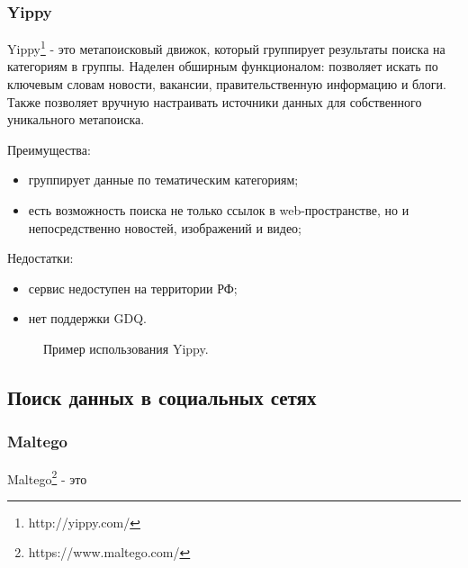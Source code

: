 \subsubsection{Yippy}
Yippy\footnote{http://yippy.com/} - это метапоисковый движок, который группирует результаты поиска на категориям в группы.
Наделен обширным функционалом: позволяет искать по ключевым словам новости, вакансии, правительственную информацию и блоги.
Также позволяет вручную настраивать источники данных для собственного уникального метапоиска. \cite{yippywikipedia}

Преимущества:
\begin{itemize}
    \item группирует данные по тематическим категориям;
    \item есть возможность поиска не только ссылок в web-пространстве, но и непосредственно новостей, изображений и видео;
\end{itemize}

Недостатки:
\begin{itemize}
    \item сервис недоступен на территории РФ;
    \item нет поддержки GDQ.
\end{itemize}

\begin{figure}[H]
    \caption{Пример использования Yippy.}
    \label{ris:image}
\end{figure}

\subsection{Поиск данных в социальных сетях}
\subsubsection{Maltego}
Maltego\footnote{https://www.maltego.com/} - это


